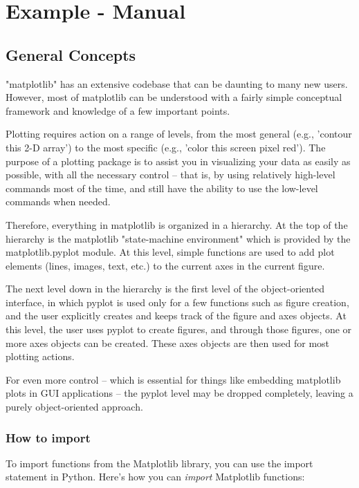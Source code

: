 \section{Example - Manual}

\subsection{General Concepts}

"matplotlib" has an extensive codebase that can be daunting to many new users. However, most of matplotlib can be understood with a fairly simple conceptual framework and knowledge of a few important points.

Plotting requires action on a range of levels, from the most general (e.g., 'contour this 2-D array') to the most specific (e.g., 'color this screen pixel red'). The purpose of a plotting package is to assist you in visualizing your data as easily as possible, with all the necessary control -- that is, by using relatively high-level commands most of the time, and still have the ability to use the low-level commands when needed.

Therefore, everything in matplotlib is organized in a hierarchy. At the top of the hierarchy is the matplotlib "state-machine environment" which is provided by the matplotlib.pyplot module. At this level, simple functions are used to add plot elements (lines, images, text, etc.) to the current axes in the current figure.

The next level down in the hierarchy is the first level of the object-oriented interface, in which pyplot is used only for a few functions such as figure creation, and the user explicitly creates and keeps track of the figure and axes objects. At this level, the user uses pyplot to create figures, and through those figures, one or more axes objects can be created. These axes objects are then used for most plotting actions.

For even more control -- which is essential for things like embedding matplotlib plots in GUI applications -- the pyplot level may be dropped completely, leaving a purely object-oriented approach.

\subsubsection{How to import}

To import functions from the Matplotlib library, you can use the import statement in Python. Here's how you can \textit{import} Matplotlib functions:

